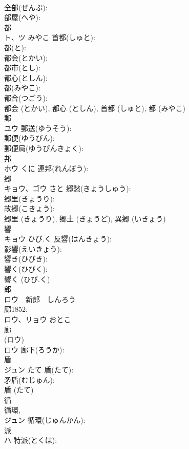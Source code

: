 \documentclass[8pt]{extreport}
\begin{document}
\begin{CJK}{UTF8}{min}
\\	全部(ぜんぶ): 
\\	部屋(へや): 
\\	都			
\\	ト、ツ	みやこ	首都(しゅと): 
\\	都(と): 
\\	都会(とかい): 
\\	都市(とし): 
\\	都心(としん): 
\\	都(みやこ): 
\\	都合(つごう): 
\\	都会 (とかい), 都心 (としん), 首都 (しゅと), 都 (みやこ)
\\	郵			
\\	ユウ		郵送(ゆうそう): 
\\	郵便(ゆうびん): 
\\	郵便局(ゆうびんきょく): 
\\	邦			
\\	ホウ	くに	連邦(れんぽう): 
\\	郷			
\\	キョウ、ゴウ	さと	郷愁(きょうしゅう): 
\\	郷里(きょうり): 
\\	故郷(こきょう): 
\\	郷里 (きょうり), 郷土 (きょうど), 異郷 (いきょう)
\\	響			
\\	キョウ	ひび.く	反響(はんきょう): 
\\	影響(えいきょう): 
\\	響き(ひびき): 
\\	響く(ひびく): 
\\	響く (ひび.く)
\\	郎			
\\	ロウ　新郎　しんろう
\\	廊1852.	
\\	ロウ、リョウ	おとこ		
\\	廊			
\\	(ロウ) 
\\	ロウ		廊下(ろうか): 
\\	盾			
\\	ジュン	たて	盾(たて): 
\\	矛盾(むじゅん): 
\\	盾 (たて)
\\	循			
\\	循環, 
\\	ジュン		循環(じゅんかん): 
\\	派			
\\	ハ		特派(とくは): 

\end{CJK}
\end{document}
